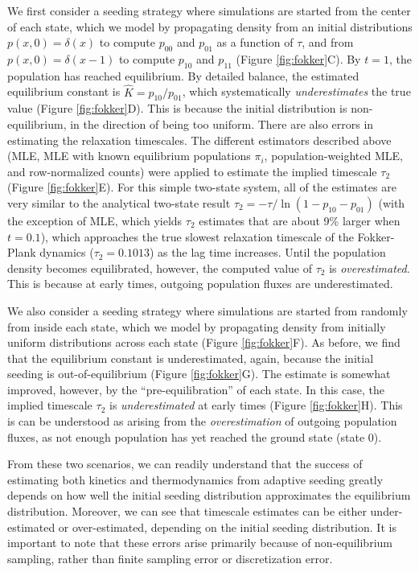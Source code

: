 \documentclass[%
 aip,
rsi,%
 amsmath,amssymb,
 reprint,%
]{revtex4-1}
\begin{document}
We first consider a seeding strategy where simulations are started from the center of each state, which we model by propagating density from an initial distributions $p(x,0) = \delta(x)$ to compute $p_{00}$ and $p_{01}$ as a function of $\tau$, and from $p(x,0) = \delta(x-1)$ to compute $p_{10}$ and $p_{11}$ (Figure \ref{fig:fokker}C).  By $t=1$, the population has reached equilibrium.  By detailed balance, the estimated equilibrium constant is $\hat{K} = p_{10}/p_{01}$, which systematically 
\textit{underestimates} the true value (Figure \ref{fig:fokker}D).  This is because the initial distribution is non-equilibrium, in the direction of being too uniform.  There are also errors in estimating the relaxation timescales.   The different estimators described above (MLE, MLE with known equilibrium populations $\pi_i$, population-weighted MLE, and row-normalized counts) were applied to estimate the implied timescale $\tau_2$ (Figure \ref{fig:fokker}E).  For this simple two-state system, all of the estimates are very similar to the analytical two-state result $\tau_2 =  -\tau/\ln (1-p_{10}-p_{01})$ (with the exception of MLE, which yields $\tau_2$ estimates that are about 9\% larger when $t = 0.1$), which approaches the true slowest relaxation timescale of the Fokker-Plank dynamics ($\tau_2 = 0.1013$) as the lag time increases.  Until the population density becomes equilibrated, however, the computed value of $\tau_2$ is \textit{overestimated}.  This is because at early times, outgoing population fluxes are underestimated.

We also consider a seeding strategy where simulations are started from randomly from inside each state, which we model by propagating density from initially uniform distributions across each state (Figure \ref{fig:fokker}F). As before, we find that the equilibrium constant is underestimated, again, because the initial seeding is out-of-equilibrium  (Figure \ref{fig:fokker}G).  The estimate is somewhat improved, however, by the ``pre-equilibration'' of each state.   In this case, the implied timescale $\tau_2$ is \textit{underestimated} at early times  (Figure \ref{fig:fokker}H).  This is can be understood as arising from the \textit{overestimation} of outgoing population fluxes, as not enough population has yet reached the ground state (state 0).

From these two scenarios, we can readily understand that the success of estimating both kinetics and thermodynamics from adaptive seeding greatly depends on how well the initial seeding distribution approximates the equilibrium distribution.  Moreover, we can see that timescale estimates can be either under-estimated or over-estimated, depending on the initial seeding distribution.
It is important to note that these errors arise primarily because of non-equilibrium sampling, rather than finite sampling error or discretization error.\cite{Prinz:2011id}
\end{document}
